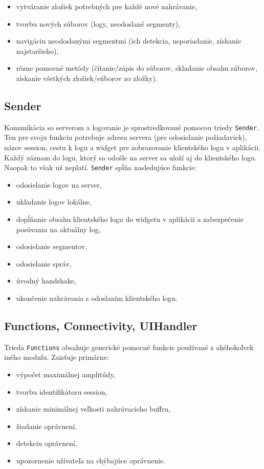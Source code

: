 \begin{itemize}
  \item{vytváranie zložiek potrebných pre každé nové nahrávanie,}
  \item{tvorbu nových súborov (logy, neodoslané segmenty),}
  \item{navigáciu neodoslanými segmentmi (ich detekcia, usporiadanie, získanie najstaršieho),}
  \item{rôzne pomocné metódy (čítanie/zápis do súborov, skladanie obsahu súborov, získanie všetkých zložiek/súborov zo zložky).}
\end{itemize}

\clearpage

\subsection*{Sender}

Komunikácia so serverom a logovanie je sprostredkované pomocou triedy \texttt{Sender}. Ten pre svoju funkciu potrebuje adresu servera (pre odosielanie požiadaviek), názov session, cestu k logu a widget pre zobrazovanie klientského logu v aplikácii. Každý záznam do logu, ktorý sa odošle na server sa uloží aj do klientského logu. Naopak to však už neplatí. \texttt{Sender} spĺňa nasledujúce funkcie:
   
   
\begin{itemize}
 \item{odosielanie logov na server,}
 \item{ukladanie logov lokálne,}
 \item{dopĺňanie obsahu klientského logu do widgetu v aplikácii a zabezpečenie posúvania na aktuálny log,}
 \item{odosielanie segmentov,}
 \item{odosielanie správ,}
 \item{úvodný handshake,}
 \item{ukončenie nahrávania s odoslaním klientského logu.}
\end{itemize}

\subsection*{Functions, Connectivity, UIHandler}

Trieda \texttt{Functions} obsahuje generické pomocné funkcie používané z akéhokoľvek iného modulu. Zaisťuje primárne:

\begin{itemize}
 \item{výpočet maximálnej amplitúdy,}
 \item{tvorbu identifikátoru session,}
 \item{získanie minimálnej veľkosti nahrávacieho buffru,}
 \item{žiadanie oprávnení,}
 \item{detekciu oprávnení,}
 \item{upozornenie užívateľa na chýbajúce oprávnenie.}
\end{itemize}

